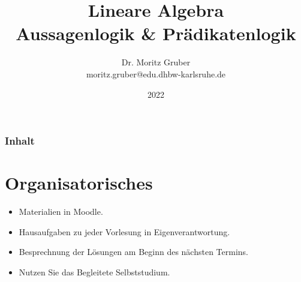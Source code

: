 


\title{Lineare Algebra\\[3mm] 
	\large Aussagenlogik \& Prädikatenlogik
}
\author{
	Dr. Moritz Gruber \\[1mm]
	\small moritz.gruber@edu.dhbw-karlsruhe.de
}
\date{2022}





%
\begin{frame}[plain] 
 \titlepage
\end{frame}
%
%
\begin{frame}\frametitle{Inhalt}
   \tableofcontents
\end{frame}
%

\section{Organisatorisches}

\begin{frame}
	
	\begin{itemize}
		\item Materialien in Moodle.
		\item Hausaufgaben zu jeder Vorlesung in Eigenverantwortung. 
		\item Besprechnung der Lösungen am Beginn des nächsten Termins. 
		\item Nutzen Sie das Begleitete Selbststudium.
	\end{itemize}
	
\end{frame}


